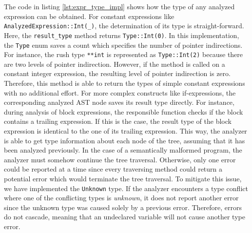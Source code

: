 The code in listing \ref{lst:expr_type_impl} shows how the type of any analyzed expression can be obtained.
For constant expressions like \verb|AnalyzedExpression::Int(_)|, the determination of its type is straight-forward.
Here, the \texttt{result\_type} method returns \verb|Type::Int(0)|.
In this implementation, the \texttt{Type} enum saves a count which specifies the number of pointer indirections.
For instance, the rush type \texttt{**int} is represented as \verb|Type::Int(2)| because there are two levels of pointer indirection.
However, if the method is called on a constant integer expression, the resulting level of pointer indirection is zero.
Therefore, this method is able to return the types of simple constant expressions with no additional effort.
For more complex constructs like if-expressions,
the corresponding analyzed AST node saves its result type directly.
For instance, during analysis of block expressions,
the responsible function checks if the block contains a trailing expression.
If this is the case, the result type of the block expression is identical to the one of its trailing expression.
This way, the analyzer is able to get type information about each node of the tree, assuming that it has been analyzed previously.
In the case of a semantically malformed program,
the analyzer must somehow continue the tree traversal.
Otherwise, only one error could be reported at a time since every traversing method could return a potential error which would terminate the tree traversal.
To mitigate this issue, we have implemented the \texttt{Unknown} type.
If the analyzer encounters a type conflict where one of the conflicting types is \emph{unknown},
it does not report another error since the unknown type was caused solely by a previous error.
Therefore, errors do not cascade, meaning that an undeclared variable will not cause another type error.

